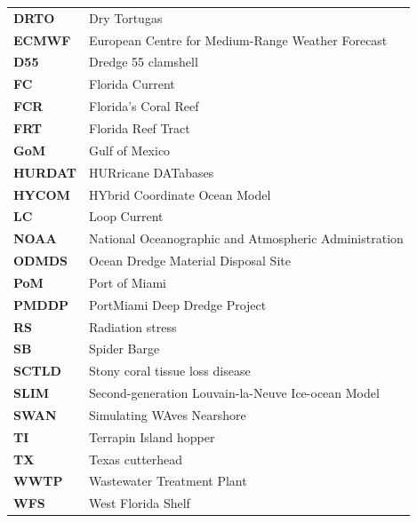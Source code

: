 \begingroup
    \setlength{\tabcolsep}{20pt}
    \renewcommand{\arraystretch}{1.3}
    \begin{tabular}{ll}
        \textbf{DRTO}   & Dry Tortugas \\
        \textbf{ECMWF}  & European Centre for Medium-Range Weather Forecast \\
        \textbf{D55}    & Dredge 55 clamshell \\
        \textbf{FC}     & Florida Current \\
        \textbf{FCR}    & Florida's Coral Reef \\
        \textbf{FRT}    & Florida Reef Tract  \\
        \textbf{GoM}    & Gulf of Mexico \\
        \textbf{HURDAT} & HURricane DATabases \\
        \textbf{HYCOM}  & HYbrid Coordinate Ocean Model \\
        \textbf{LC}     & Loop Current \\
        \textbf{NOAA}   & National Oceanographic and Atmospheric Administration \\
        \textbf{ODMDS}	& Ocean Dredge Material Disposal Site \\
        \textbf{PoM}    & Port of Miami \\
        \textbf{PMDDP}  & PortMiami Deep Dredge Project \\
        \textbf{RS}     & Radiation stress \\
        \textbf{SB}     & Spider Barge \\
        \textbf{SCTLD}  & Stony coral tissue loss disease \\
        \textbf{SLIM}   & Second-generation Louvain-la-Neuve Ice-ocean Model\\
        \textbf{SWAN}   & Simulating WAves Nearshore \\
        \textbf{TI}     & Terrapin Island hopper \\
        \textbf{TX}     & Texas cutterhead \\
        \textbf{WWTP}	& Wastewater Treatment Plant \\
        \textbf{WFS}    & West Florida Shelf
    \end{tabular}
\endgroup